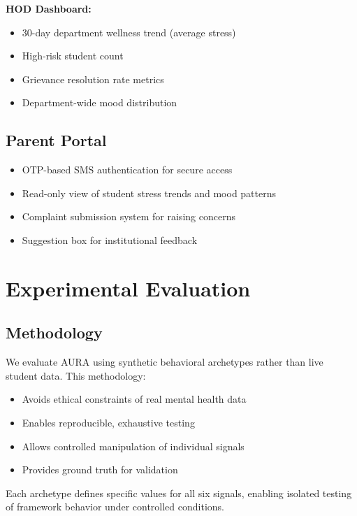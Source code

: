 \documentclass[journal]{IEEEtran}
\begin{document}
\textbf{HOD Dashboard:}
\begin{itemize}
    \item 30-day department wellness trend (average stress)
    \item High-risk student count
    \item Grievance resolution rate metrics
    \item Department-wide mood distribution
\end{itemize}

\subsection{Parent Portal}

\begin{itemize}
    \item OTP-based SMS authentication for secure access
    \item Read-only view of student stress trends and mood patterns
    \item Complaint submission system for raising concerns
    \item Suggestion box for institutional feedback
\end{itemize}

\section{Experimental Evaluation}
\label{sec:evaluation}

\subsection{Methodology}

We evaluate AURA using synthetic behavioral archetypes rather than live student data. This methodology:

\begin{itemize}
    \item Avoids ethical constraints of real mental health data
    \item Enables reproducible, exhaustive testing
    \item Allows controlled manipulation of individual signals
    \item Provides ground truth for validation
\end{itemize}

Each archetype defines specific values for all six signals, enabling isolated testing of framework behavior under controlled conditions.
\end{document}
